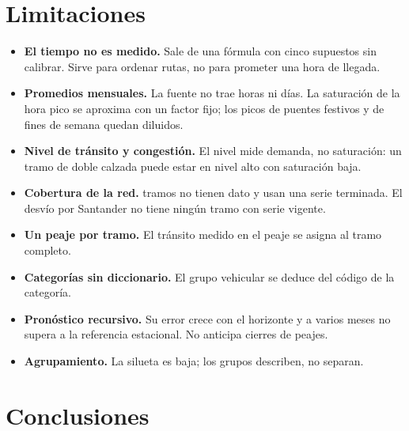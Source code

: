 \documentclass[12pt,a4paper]{article}
\begin{document}
\section{Limitaciones}
\label{sec:limitaciones}

\begin{itemize}
\item \textbf{El tiempo no es medido.} Sale de una fórmula con cinco
supuestos sin calibrar. Sirve para ordenar rutas, no para prometer una hora
de llegada.
\item \textbf{Promedios mensuales.} La fuente no trae horas ni días. La
saturación de la hora pico se aproxima con un factor fijo; los picos de
puentes festivos y de fines de semana quedan diluidos.
\item \textbf{Nivel de tránsito y congestión.} El nivel mide demanda, no
saturación: un tramo de doble calzada puede estar en nivel alto con
saturación baja.
\item \textbf{Cobertura de la red.} \ctTramosSinDato{} tramos no tienen dato y
\ctTramosHistoricos{} usan una serie terminada. El desvío por Santander no
tiene ningún tramo con serie vigente.
\item \textbf{Un peaje por tramo.} El tránsito medido en el peaje se asigna
al tramo completo.
\item \textbf{Categorías sin diccionario.} El grupo vehicular se deduce del
código de la categoría.
\item \textbf{Pronóstico recursivo.} Su error crece con el horizonte y a
varios meses no supera a la referencia estacional. No anticipa cierres de
peajes.
\item \textbf{Agrupamiento.} La silueta es baja; los grupos describen, no
separan.
\end{itemize}

\section{Conclusiones}
\label{sec:conclusiones}
\end{document}
